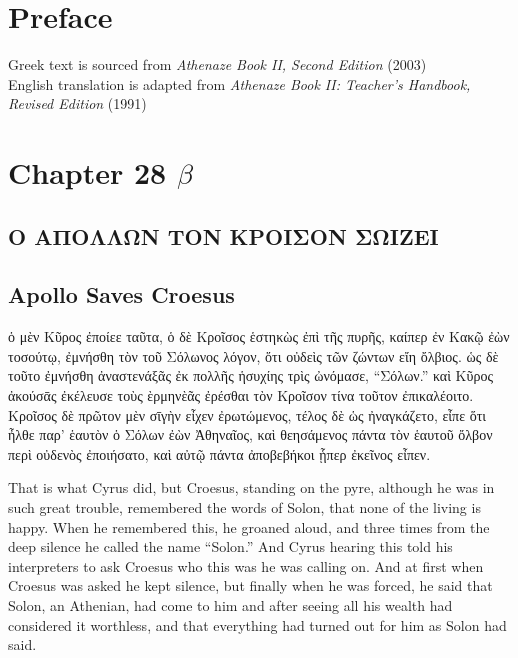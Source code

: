 \documentclass{article}
\begin{document}
\section{Preface}

Greek text is sourced from \emph{Athenaze Book II, Second Edition} (2003) \\
English translation is adapted from \emph{Athenaze Book II: Teacher's Handbook, Revised Edition} (1991)

\section{Chapter 28 $\beta$}

\subsection*{\textgreek{Ο ΑΠΟΛΛΩΝ ΤΟΝ ΚΡΟΙΣΟΝ ΣΩΙΖΕΙ}}
\subsection*{Apollo Saves Croesus}

\begin{greek}
ὁ μὲν Κῦρος ἐποίεε ταῦτα, ὁ δὲ Κροῖσος ἑστηκὼς ἐπὶ τῆς πυρῆς,
καίπερ ἐν Κακῷ ἐὼν τοσούτῳ, ἐμνήσθη τὸν τοῦ Σόλωνος λόγον,
ὅτι οὐδεὶς τῶν ζώντων εἴη ὄλβιος.
ὡς δὲ τοῦτο ἐμνήσθη ἀναστενάξᾶς ἐκ πολλῆς ἡσυχίης τρὶς ὠνόμασε, “Σόλων.”
καὶ Κῦρος ἀκούσᾱς ἐκέλευσε τοὺς ὲρμηνὲᾶς ἐρέσθαι τὸν Κροῖσον τίνα τοῦτον ἐπικαλέοιτο.
Κροῖσος δὲ πρῶτον μὲν σῑγὴν εἶχεν ἐρωτώμενος, τέλος δὲ ὡς ἠναγκάζετο,
εἶπε ὅτι ἦλθε παρ’ ἑαυτὸν ὁ Σόλων ἐὼν Ἀθηναῖος,
καὶ θεησάμενος πάντα τὸν ἑαυτοῦ ὄλβον περὶ οὐδενὸς ἐποιήσατο,
καὶ αὐτῷ πάντα ἀποβεβήκοι ᾗπερ ἐκεῖνος εἶπεν. \\
\end{greek}


That is what Cyrus did, but Croesus, standing on the pyre,
although he was in such great trouble, remembered the words of Solon,
that none of the living is happy.
When he remembered this, he groaned aloud,
and three times from the deep silence he called the name ``Solon.''
And Cyrus hearing this told his interpreters to ask Croesus who this was he was calling on.
And at first when Croesus was asked he kept silence,
but finally when he was forced, he said that Solon, an Athenian, had come to him
and after seeing all his wealth had considered it worthless,
and that everything had turned out for him as Solon had said. \\
\end{document}
